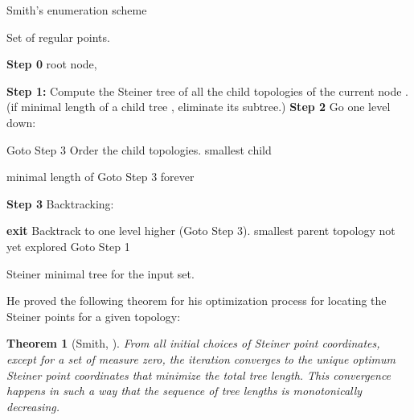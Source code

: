 \documentclass{article}
\theoremstyle{plain}
\newtheorem{theorem}{Theorem}[section]
\begin{document}
\begin{algorithm}
\renewcommand{\algorithmicrequire}{\textbf{Input:}}
\renewcommand{\algorithmicensure}{\textbf{Output:}}

\caption{Smith's enumeration scheme \protect\cite{Smith}} 
\label{SES}

\begin{algorithmic}[1]
\Require Set of regular points.
\Statex\hrulefill
\begin{spacing}{1.2}
\Statex \textbf{Step 0}  root node, 
\State 

\Repeat
	\Statex \Comment \textbf{Step 1:}
	\State Compute the Steiner tree of all the child topologies of the current node . 
	\State (if minimal length of a child tree , eliminate its subtree.)
	\Statex \Comment \textbf{Step 2} Go one level down:

		\State Goto Step 3
	\Else
			\State Order the child topologies.
			\State  smallest child
			
		\Else 
				\State  minimal length of  
				\State 
				\EndIf
			\EndFor
			\State Goto Step 3
		\EndIf
	\EndIf
\Until forever

\Statex \Comment \textbf{Step 3} Backtracking:

		\State \textbf{exit}
	\Else
		\State Backtrack to one level higher (Goto Step 3).
	\EndIf
\Else
\State  smallest parent topology not yet explored
\State Goto Step 1
\EndIf

\end{spacing}
\hrulefill
\Ensure Steiner minimal tree  for the input set.

\end{algorithmic}
\end{algorithm}


He proved the following theorem for his optimization process for locating the Steiner points for a given topology: 
\begin{theorem}[Smith, \cite{Smith}]
\label{thmSmith}
From all initial choices of Steiner point coordinates, except for a set of measure zero, the iteration converges to the unique optimum Steiner point coordinates that minimize the total tree length. This convergence happens in such a way that the sequence of tree lengths is monotonically decreasing.
\end{theorem}
\end{document}
